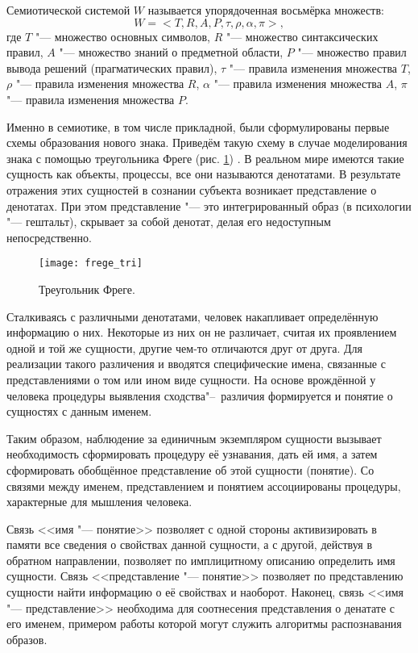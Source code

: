 \begin{Def}
	Семиотической системой $W$ называется упорядоченная восьмёрка множеств:
	\begin{equation}
		W=<T,R,A,P,\tau,\rho,\alpha,\pi>,
	\end{equation} 
	где	$T$ "--- множество основных символов, $R$ "--- множество синтаксических правил, $A$ "--- множество знаний о предметной области, $P$ "--- множество правил вывода решений (прагматических правил), $\tau$ "--- правила изменения множества $T$, $\rho$ "--- правила изменения множества $R$, $\alpha$ "--- правила изменения множества $A$, $\pi$ "--- правила изменения множества $P$.
\end{Def}

Именно в семиотике, в том числе прикладной, были сформулированы первые схемы образования нового знака. Приведём такую схему в случае моделирования знака с помощью треугольника Фреге (рис. \ref{fg:frege_sign}) \cite{Frege2000,Pirs2000}. В реальном мире имеются такие сущность как объекты, процессы, все они называются денотатами. В результате отражения этих сущностей в сознании субъекта возникает представление о денотатах. При этом представление "--- это интегрированный образ (в психологии "--- гештальт), скрывает за собой денотат, делая его недоступным непосредственно.

\begin{figure}[h]
	\centering
	\texttt{[image: frege\_tri]}
	\caption{Треугольник Фреге.}
	\label{fg:frege_sign}
\end{figure}

Сталкиваясь с различными денотатами, человек накапливает определённую информацию о них. Некоторые из них он не различает, считая их проявлением одной и той же сущности, другие чем-то отличаются друг от друга. Для реализации такого различения и вводятся специфические имена, связанные с представлениями о том или ином виде сущности. На основе врождённой у человека процедуры выявления сходства"--~различия формируется и понятие о сущностях с данным именем.

Таким образом, наблюдение за единичным экземпляром сущности вызывает необходимость сформировать процедуру её узнавания, дать ей имя, а затем сформировать обобщённое представление об этой сущности (понятие). Со связями между именем, представлением и понятием ассоциированы процедуры, характерные для мышления человека.

Связь <<имя "--- понятие>> позволяет с одной стороны активизировать в памяти все сведения о свойствах данной сущности, а с другой, действуя в обратном направлении, позволяет по имплицитному описанию определить имя сущности. Связь <<представление "--- понятие>> позволяет по представлению сущности найти информацию о её свойствах и наоборот. Наконец, связь <<имя "--- представление>> необходима для соотнесения представления о денатате с его именем, примером работы которой могут служить алгоритмы распознавания образов.

